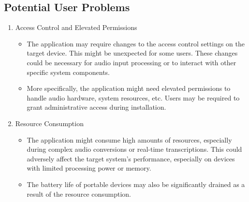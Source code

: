 \documentclass[12pt]{article}
\begin{document}
\subsection{Potential User Problems}
\begin{enumerate}
  \item Access Control and Elevated Permissions
  \begin{itemize}
      \item The application may require changes to the access control settings on the target device. This might be unexpected for 
      some users. These changes could be necessary for audio input processing or to interact with other specific system components.
      \item More specifically, the application might need elevated permissions to handle audio hardware, system resources, etc. Users 
      may be required to grant administrative access during installation.
  \end{itemize}

  \item Resource Consumption
  \begin{itemize}
      \item The application might consume high amounts of resources, especially during complex audio conversions or real-time 
      transcriptions. This could adversely affect the target system’s performance, especially on devices with limited processing 
      power or memory.
      \item The battery life of portable devices may also be significantly drained as a result of the resource consumption.
  \end{itemize}
\end{enumerate}
\end{document}
